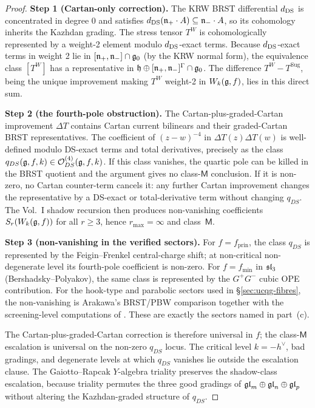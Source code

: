 \begin{proof}
\textbf{Step 1 (Cartan-only correction).} The KRW BRST differential
$d_{\mathrm{DS}}$ is concentrated in degree 0 and satisfies
$d_{\mathrm{DS}}(\mathfrak{n}_{+}\cdot A) \subseteq \mathfrak{n}_{-}\cdot A$, so its cohomology
inherits the Kazhdan grading. The stress tensor $T^{W}$ is
cohomologically represented by a weight-2 element modulo
$d_{\mathrm{DS}}$-exact terms. Because $d_{\mathrm{DS}}$-exact terms in weight 2 lie
in $[\mathfrak{n}_{+}, \mathfrak{n}_{-}]\cap \mathfrak{g}_0$ (by the KRW normal form), the
equivalence class $[T^{W}]$ has a representative in $\mathfrak{h}\oplus
[\mathfrak{n}_{+}, \mathfrak{n}_{-}]^{\Gamma}\cap\mathfrak{g}_0$. The difference
$T^{W} - T^{\mathrm{Sug}}$, being the unique improvement making
$T^{W}$ weight-2 in $W_k(\mathfrak{g}, f)$, lies in this direct sum.

\textbf{Step 2 (the fourth-pole obstruction).} The
Cartan-plus-graded-Cartan improvement $\Delta T$ contains Cartan
current bilinears and their graded-Cartan BRST representatives. The
coefficient of $(z-w)^{-4}$ in $\Delta T(z)\Delta T(w)$ is well-defined
modulo DS-exact terms and total derivatives, precisely as the class
$q_{DS}(\mathfrak{g},f,k)\in\mathcal O^{(4)}_{DS}(\mathfrak{g},f,k)$. If this class
vanishes, the quartic pole can be killed in the BRST quotient and the
argument gives no class-$\mathsf M$ conclusion. If it is non-zero, no
Cartan counter-term cancels it: any further Cartan improvement changes
the representative by a DS-exact or total-derivative term without
changing $q_{DS}$. The Vol.~I shadow recursion then produces
non-vanishing coefficients $S_r(W_k(\mathfrak{g}, f))$ for all $r\ge 3$, hence
$r_{\max}=\infty$ and class~$\mathsf M$.

\textbf{Step 3 (non-vanishing in the verified sectors).} For
$f=f_{\mathrm{prin}}$, the class $q_{DS}$ is represented by the
Feigin--Frenkel central-charge shift; at non-critical non-degenerate
level its fourth-pole coefficient is non-zero. For
$f=f_{\mathrm{min}}$ in $\mathfrak{sl}_3$ (Bershadsky--Polyakov), the same
class is represented by the $G^+G^-$ cubic OPE contribution. For the
hook-type and parabolic sectors used in \S\ref{sec:ucqg-fibres}, the
non-vanishing is Arakawa's BRST/PBW comparison together with the
screening-level computations of \cite{Arakawa07}. These are exactly
the sectors named in part~(c).

The Cartan-plus-graded-Cartan correction is therefore universal in
$f$; the class-$\mathsf M$ escalation is universal on the non-zero
$q_{DS}$ locus. The critical level $k=-h^{\vee}$, bad gradings, and
degenerate levels at which $q_{DS}$ vanishes lie outside the
escalation clause. The Gaiotto--Rapcak $Y$-algebra triality preserves
the shadow-class escalation, because triality permutes the three good
gradings of $\mathfrak{gl}_m\oplus \mathfrak{gl}_n\oplus \mathfrak{gl}_p$ without altering the
Kazhdan-graded structure of $q_{DS}$.
\end{proof}

